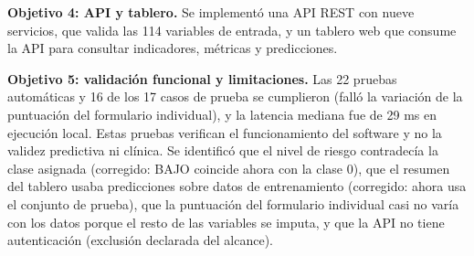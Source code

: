 \noindent\hspace*{\parindent}\textbf{Objetivo 4: API y tablero.} Se implementó una API REST con nueve servicios, que valida las 114 variables de entrada, y un tablero web que consume la API para consultar indicadores, métricas y predicciones.

\noindent\hspace*{\parindent}\textbf{Objetivo 5: validación funcional y limitaciones.} Las 22 pruebas automáticas y 16 de los 17 casos de prueba se cumplieron (falló la variación de la puntuación del formulario individual), y la latencia mediana fue de 29 ms en ejecución local. Estas pruebas verifican el funcionamiento del software y no la validez predictiva ni clínica. Se identificó que el nivel de riesgo contradecía la clase asignada (corregido: BAJO coincide ahora con la clase 0), que el resumen del tablero usaba predicciones sobre datos de entrenamiento (corregido: ahora usa el conjunto de prueba), que la puntuación del formulario individual casi no varía con los datos porque el resto de las variables se imputa, y que la API no tiene autenticación (exclusión declarada del alcance).

